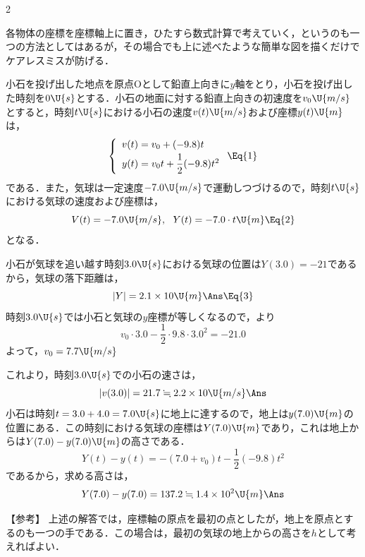 \begin{multicols}{2}
\begin{sisin}
各物体の座標を座標軸上に置き，ひたすら数式計算で考えていく，というのも一つの方法としてはあるが，その場合でも上に述べたような簡単な図を描くだけでケアレスミスが防げる．
\end{sisin}
\par\nopagebreak
\hspace{1zw}小石を投げ出した地点を原点$\mathrm{O}$として鉛直上向きに$y$軸をとり，小石を投げ出した時刻を$0\U{s}$とする．小石の地面に対する鉛直上向きの初速度を$v_0\U{m/s}$とすると，時刻$t\U{s}$における小石の速度$v(t)\U{m/s}$および座標$y(t)\U{m}$は，
\[\left\{\begin{array}{l}
  v(t)=v_0+(-9.8)t\\[1mm]
  y(t)=v_0t+\dfrac{1}{2}(-9.8)t^2
\end{array}\right.\Eq{1}\]
である．また，気球は一定速度$-7.0\U{m/s}$で運動しつづけるので，時刻$t\U{s}$における気球の速度および座標は，
\[V(t)=-7.0\U{m/s},\ \ Y(t)=-7.0\cdot t\U{m}\Eq{2}\]
となる．
\begin{komon}
 小石が気球を追い越す時刻$3.0\U{s}$における気球の位置は$Y(3.0)=-21$であるから，気球の落下距離は，
       \[|Y|=2.1\times 10\U{m}\Ans\Eq{3}\]
 時刻$3.0\U{s}$では小石と気球の$y$座標が等しくなるので，より
       \[v_0\cdot 3.0-\frac{1}{2}\cdot 9.8\cdot 3.0^2=-21.0\]
       よって，$v_0=7.7\U{m/s}$\par
       \hspace{1zw}これより，時刻$3.0\U{s}$での小石の速さは，
       \[|v(3.0)|=21.7\fallingdotseq 2.2\times 10\U{m/s}\Ans\]
 小石は時刻$t=3.0+4.0=7.0\U{s}$に地上に達するので，地上は$y(7.0)\U{m}$の位置にある．この時刻における気球の座標は$Y(7.0)\U{m}$であり，これは地上からは$Y(7.0)-y(7.0)\U{m}$の高さである．
       \[Y(t)-y(t)=-(7.0+v_0)t-\frac{1}{2}(-9.8)t^2\]
       であるから，求める高さは，
       \[Y(7.0)-y(7.0)=137.2\fallingdotseq 1.4\times 10^2\U{m}\Ans\]
\end{komon}
\begin{itembox}[l]{【参考】}
\hspace{1zw}上述の解答では，座標軸の原点を最初の点としたが，地上を原点とするのも一つの手である．この場合は，最初の気球の地上からの高さを$h$として考えればよい．
\end{itembox}


\end{multicols}
